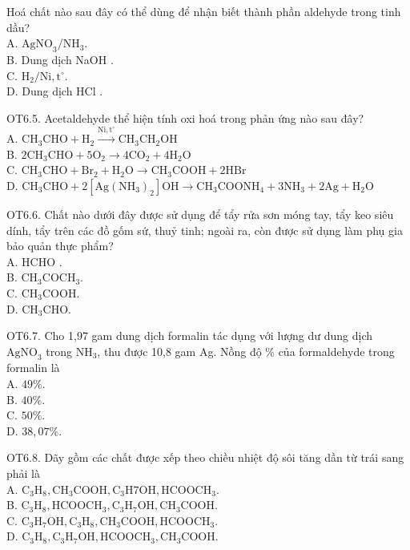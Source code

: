 \documentclass[10pt]{article}
\begin{document}
Hoá chất nào sau đây có thể dùng để nhận biết thành phần aldehyde trong tinh dầu?\\
A. $\mathrm{AgNO}_{3} / \mathrm{NH}_{3}$.\\
B. Dung dịch NaOH .\\
C. $\mathrm{H}_{2} / \mathrm{Ni}, \mathrm{t}^{\circ}$.\\
D. Dung dịch HCl .

OT6.5. Acetaldehyde thể hiện tính oxi hoá trong phản ứng nào sau đây?\\
A. $\mathrm{CH}_{3} \mathrm{CHO}+\mathrm{H}_{2} \xrightarrow{\mathrm{Ni}, \mathrm{t}^{\circ}} \mathrm{CH}_{3} \mathrm{CH}_{2} \mathrm{OH}$\\
B. $2 \mathrm{CH}_{3} \mathrm{CHO}+5 \mathrm{O}_{2} \longrightarrow 4 \mathrm{CO}_{2}+4 \mathrm{H}_{2} \mathrm{O}$\\
C. $\mathrm{CH}_{3} \mathrm{CHO}+\mathrm{Br}_{2}+\mathrm{H}_{2} \mathrm{O} \rightarrow \mathrm{CH}_{3} \mathrm{COOH}+2 \mathrm{HBr}$\\
D. $\mathrm{CH}_{3} \mathrm{CHO}+2\left[\mathrm{Ag}\left(\mathrm{NH}_{3}\right)_{2}\right] \mathrm{OH} \rightarrow \mathrm{CH}_{3} \mathrm{COONH}_{4}+3 \mathrm{NH}_{3}+2 \mathrm{Ag}+\mathrm{H}_{2} \mathrm{O}$

OT6.6. Chất nào dưới đây được sử dụng để tẩy rửa sơn móng tay, tẩy keo siêu dính, tẩy trên các đồ gốm sứ, thuỷ tinh; ngoài ra, còn được sử dụng làm phụ gia bảo quản thực phẩm?\\
A. HCHO .\\
B. $\mathrm{CH}_{3} \mathrm{COCH}_{3}$.\\
C. $\mathrm{CH}_{3} \mathrm{COOH}$.\\
D. $\mathrm{CH}_{3} \mathrm{CHO}$.

OT6.7. Cho 1,97 gam dung dịch formalin tác dụng với lượng dư dung dịch $\mathrm{AgNO}_{3}$ trong $\mathrm{NH}_{3}$, thu được 10,8 gam Ag. Nồng độ \% của formaldehyde trong formalin là\\
A. $49 \%$.\\
B. $40 \%$.\\
C. $50 \%$.\\
D. $38,07 \%$.

OT6.8. Dãy gồm các chất được xếp theo chiều nhiệt độ sôi tăng dần từ trái sang phải là\\
A. $\mathrm{C}_{3} \mathrm{H}_{8}, \mathrm{CH}_{3} \mathrm{COOH}, \mathrm{C}_{3} \mathrm{H} 7 \mathrm{OH}, \mathrm{HCOOCH}_{3}$.\\
B. $\mathrm{C}_{3} \mathrm{H}_{8}, \mathrm{HCOOCH}_{3}, \mathrm{C}_{3} \mathrm{H}_{7} \mathrm{OH}, \mathrm{CH}_{3} \mathrm{COOH}$.\\
C. $\mathrm{C}_{3} \mathrm{H}_{7} \mathrm{OH}, \mathrm{C}_{3} \mathrm{H}_{8}, \mathrm{CH}_{3} \mathrm{COOH}, \mathrm{HCOOCH}_{3}$.\\
D. $\mathrm{C}_{3} \mathrm{H}_{8}, \mathrm{C}_{3} \mathrm{H}_{7} \mathrm{OH}, \mathrm{HCOOCH}_{3}, \mathrm{CH}_{3} \mathrm{COOH}$.
\end{document}
